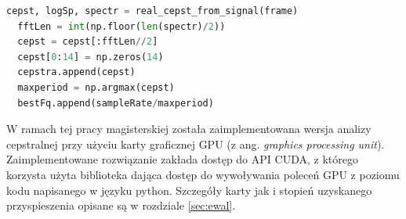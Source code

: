 \documentclass[12pt,a4paper,twoside]{mwart}
\begin{document}
\begin{lstlisting}[language=Python, caption={Estymacja F0 przy pomocy cepstrum}, captionpos=b, label={code:cepsF0Cpu}]
  cepst, logSp, spectr = real_cepst_from_signal(frame)
  fftLen = int(np.floor(len(spectr)/2))
  cepst = cepst[:fftLen//2]
  cepst[0:14] = np.zeros(14)
  cepstra.append(cepst)
  maxperiod = np.argmax(cepst)
  bestFq.append(sampleRate/maxperiod)
\end{lstlisting}

W ramach tej pracy magisterskiej została zaimplementowana wersja analizy cepstralnej przy użyciu karty graficznej GPU (z ang. \textit{graphics processing unit}). Zaimplementowane rozwiązanie zakłada dostęp do API CUDA, z którego korzysta użyta biblioteka dająca dostęp do wywoływania poleceń GPU z poziomu kodu napisanego w języku python. Szczegóły karty jak i stopień uzyskanego przyspieszenia opisane są w rozdziale \ref{sec:ewal}.
\end{document}
